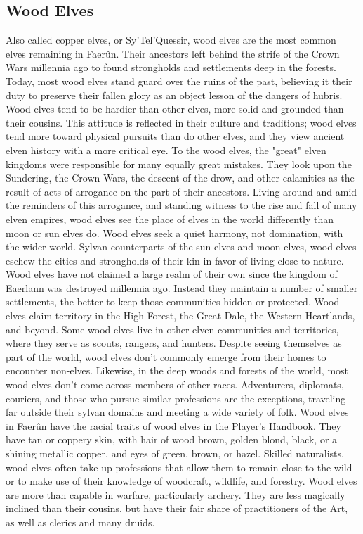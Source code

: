 \documentclass[10pt,a4paper,twoside,twocolumn,openany,bg=print,nodeprecatedcode]{dndbook}
\begin{document}
\subsection{Wood Elves}
Also called copper elves, or Sy'Tel'Quessir, wood elves are the most common elves remaining in Faerûn. Their ancestors left behind the strife of the Crown Wars millennia ago to found strongholds and settlements deep in the forests. Today, most wood elves stand guard over the ruins of the past, believing it their duty to preserve their fallen glory as an object lesson of the dangers of hubris.
Wood elves tend to be hardier than other elves, more solid and grounded than their cousins. This attitude is reflected in their culture and traditions; wood elves tend more toward physical pursuits than do other elves, and they view ancient elven history with a more critical eye. To the wood elves, the "great" elven kingdoms were responsible for many equally great mistakes. They look upon the Sundering, the Crown Wars, the descent of the drow, and other calamities as the result of acts of arrogance on the part of their ancestors. Living around and amid the reminders of this arrogance, and standing witness to the rise and fall of many elven empires, wood elves see the place of elves in the world differently than moon or sun elves do. Wood elves seek a quiet harmony, not domination, with the wider world.
Sylvan counterparts of the sun elves and moon elves, wood elves eschew the cities and strongholds of their kin in favor of living close to nature. Wood elves have not claimed a large realm of their own since the kingdom of Eaerlann was destroyed millennia ago. Instead they maintain a number of smaller settlements, the better to keep those communities hidden or protected. Wood elves claim territory in the High Forest, the Great Dale, the Western Heartlands, and beyond. Some wood elves live in other elven communities and territories, where they serve as scouts, rangers, and hunters.
Despite seeing themselves as part of the world, wood elves don't commonly emerge from their homes to encounter non-elves. Likewise, in the deep woods and forests of the world, most wood elves don't come across members of other races. Adventurers, diplomats, couriers, and those who pursue similar professions are the exceptions, traveling far outside their sylvan domains and meeting a wide variety of folk.
Wood elves in Faerûn have the racial traits of wood elves in the Player's Handbook. They have tan or coppery skin, with hair of wood brown, golden blond, black, or a shining metallic copper, and eyes of green, brown, or hazel.
Skilled naturalists, wood elves often take up professions that allow them to remain close to the wild or to make use of their knowledge of woodcraft, wildlife, and forestry. Wood elves are more than capable in warfare, particularly archery. They are less magically inclined than their cousins, but have their fair share of practitioners of the Art, as well as clerics and many druids.
\end{document}
